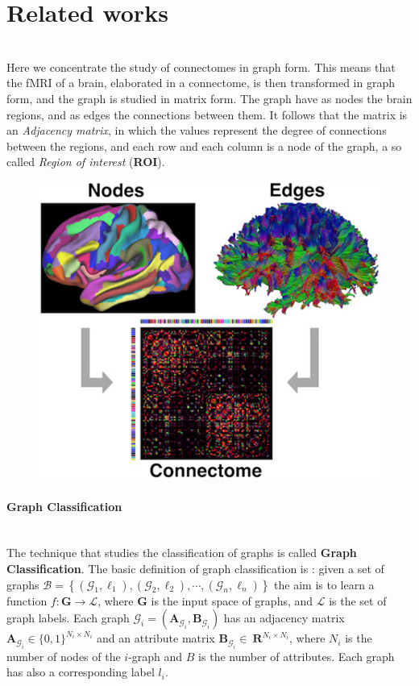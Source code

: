 \section{Related works}\
\\
Here we concentrate the study of connectomes in graph form. This means that the fMRI of a brain, elaborated in a connectome, is then transformed in graph form, and the graph is studied in matrix form. The graph have as nodes the brain regions, and as edges the connections between them. It follows that the matrix is an \emph{Adjacency matrix}, in which the values represent the degree of connections between the regions, and each row and each column is a node of the graph, a so called \emph{Region of interest} (\textbf{ROI}).
\begin{figure}[htbp]
	\centering
	\includegraphics[scale=0.8]{Immagini/nbm3752-toc-0001-m.jpg}
	\caption{\label{fig:diagram4}}
\end{figure}

\paragraph{Graph Classification}\
\\
The technique that studies the classification of graphs is called \textbf{Graph Classification}. The basic definition of graph classification is \cite{10.1145/3219819.3219980}: given a set of graphs $\mathcal{B}=\left\{\left(\mathcal{G}_{1}, \ell_{1}\right),\left(\mathcal{G}_{2}, \ell_{2}\right), \cdots,\left(\mathcal{G}_{n}, \ell_{n}\right)\right\}$ the aim is to learn a function $f: \mathbf{G} \rightarrow \mathcal{L}$, where $\mathbf{G}$ is the input space of graphs, and $\mathcal{L}$ is the set of graph labels. Each graph $\mathcal{G}_{i}=\left(\mathbf{A}_{\mathcal{G}_{i}}, \mathbf{B}_{\mathcal{G}_{i}}\right)$ has an adjacency matrix $\mathbf{A}_{\mathcal{G}_{i}} \in\{0,1\}^{N_{i} \times N_{i}}$ and an attribute matrix $\mathbf{B}_{\mathcal{G}_{i}} \in\ \mathbf{R}^{N_{i} \times N_{i}}$, where ${N}_{i}$ is the number of nodes of the $i$-graph and $B$ is the number of attributes. Each graph has also a corresponding label $l_{i}$. 	

